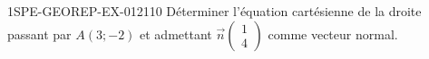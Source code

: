 \begin{exercice}{1SPE-GEOREP-EX-012}{1}{10}
Déterminer l'équation cartésienne de la droite passant par $A(3 ; -2)$ et admettant $\vec{n}\begin{pmatrix} 1 \\ 4 \end{pmatrix}$ comme vecteur normal.
\end{exercice}
